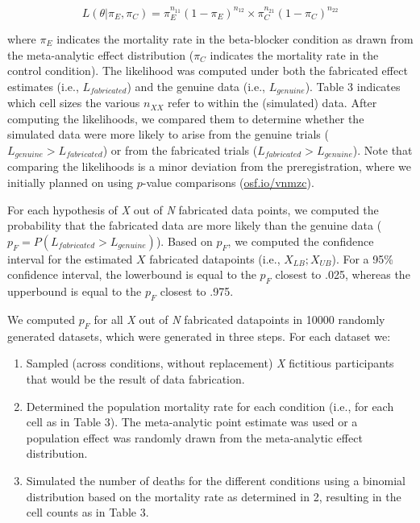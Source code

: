 \documentclass[]{article}
\begin{document}
\begin{equation}
\label{eq1}
L(\theta|\pi_{E},\pi_{C})=\pi_{E}^{n_{11}}(1-\pi_{E})^{n_{12}} \times \pi_{C}^{n_{21}}(1 - \pi_{C})^{n_{22}}
\end{equation}

where \(\pi_{E}\) indicates the mortality rate in the beta-blocker
condition as drawn from the meta-analytic effect distribution
(\(\pi_{C}\) indicates the mortality rate in the control condition). The
likelihood was computed under both the fabricated effect estimates
(i.e., \(L_{fabricated}\)) and the genuine data (i.e., \(L_{genuine}\)).
Table 3 indicates which cell sizes the various \(n_{XX}\) refer to
within the (simulated) data. After computing the likelihoods, we
compared them to determine whether the simulated data were more likely
to arise from the genuine trials (\(L_{genuine}>L_{fabricated}\)) or
from the fabricated trials (\(L_{fabricated}>L_{genuine}\)). Note that
comparing the likelihoods is a minor deviation from the preregistration,
where we initially planned on using \(p\)-value comparisons
(\href{https://osf.io/vnmzc}{osf.io/vnmzc}).

For each hypothesis of \emph{X} out of \emph{N} fabricated data points,
we computed the probability that the fabricated data are more likely
than the genuine data (\(p_F=P(L_{fabricated}>L_{genuine})\)). Based on
\(p_F\), we computed the confidence interval for the estimated \(X\)
fabricated datapoints (i.e., \(X_{LB};X_{UB}\)). For a 95\% confidence
interval, the lowerbound is equal to the \(p_F\) closest to .025,
whereas the upperbound is equal to the \(p_F\) closest to .975.

We computed \(p_F\) for all \emph{X} out of \emph{N} fabricated
datapoints in 10000 randomly generated datasets, which were generated in
three steps. For each dataset we:

\begin{enumerate}
\def\labelenumi{\arabic{enumi}.}
\item
  Sampled (across conditions, without replacement) \emph{X} fictitious
  participants that would be the result of data fabrication.
\item
  Determined the population mortality rate for each condition (i.e., for
  each cell as in Table 3). The meta-analytic point estimate was used or
  a population effect was randomly drawn from the meta-analytic effect
  distribution.
\item
  Simulated the number of deaths for the different conditions using a
  binomial distribution based on the mortality rate as determined in 2,
  resulting in the cell counts as in Table 3.
\end{enumerate}
\end{document}
